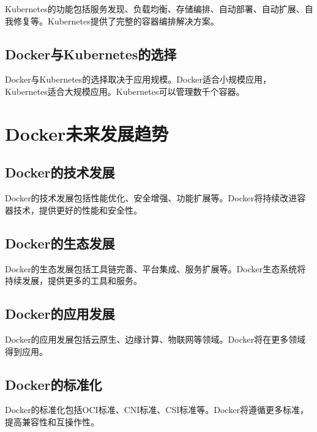 \documentclass[12pt,UTF8]{ctexbook}
\begin{document}
Kubernetes的功能包括服务发现、负载均衡、存储编排、自动部署、自动扩展、自我修复等。Kubernetes提供了完整的容器编排解决方案。

\section{Docker与Kubernetes的选择}

Docker与Kubernetes的选择取决于应用规模。Docker适合小规模应用，Kubernetes适合大规模应用。Kubernetes可以管理数千个容器。

\chapter{Docker未来发展趋势}

\section{Docker的技术发展}

Docker的技术发展包括性能优化、安全增强、功能扩展等。Docker将持续改进容器技术，提供更好的性能和安全性。

\section{Docker的生态发展}

Docker的生态发展包括工具链完善、平台集成、服务扩展等。Docker生态系统将持续发展，提供更多的工具和服务。

\section{Docker的应用发展}

Docker的应用发展包括云原生、边缘计算、物联网等领域。Docker将在更多领域得到应用。

\section{Docker的标准化}

Docker的标准化包括OCI标准、CNI标准、CSI标准等。Docker将遵循更多标准，提高兼容性和互操作性。

\backmatter
\end{document}
